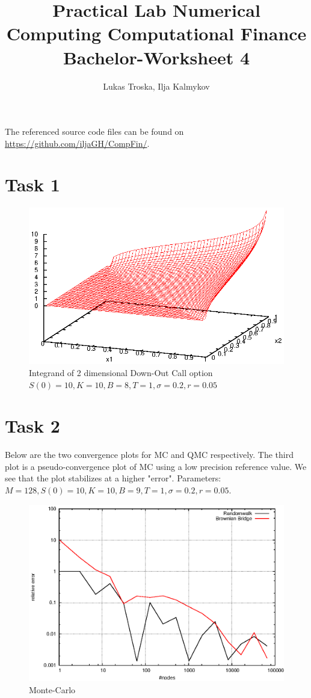 \documentclass[]{article}
\title{Practical Lab Numerical Computing Computational Finance \\Bachelor-Worksheet 4}
\author{Lukas Troska, Ilja Kalmykov}
\date{}
\begin{document}
\maketitle

The referenced source code files can be found on
\url{https://github.com/iljaGH/CompFin/}.

\section*{Task 1}
\begin{figure}[!ht]
\centering
\includegraphics[width=.9\textwidth]{task1.eps}
\caption{Integrand of 2 dimensional Down-Out Call option $S(0)=10,K=10,B=8,T=1,\sigma=0.2,r=0.05$}
\label{fig:Task1}
\end{figure}
\clearpage


\section*{Task 2}
Below are the two convergence plots for MC and QMC respectively. The third plot is a pseudo-convergence plot of MC using a low precision reference value. We see that the plot stabilizes at a higher "error". Parameters: $M=128,S(0)=10,K=10,B=9,T=1,\sigma=0.2,r=0.05$.

\begin{figure}[!ht]
\centering
\includegraphics[width=.9\textwidth]{task2_mc_high.eps}
\caption{Monte-Carlo}
\label{fig:Task2a}
\end{figure}
\end{document}
